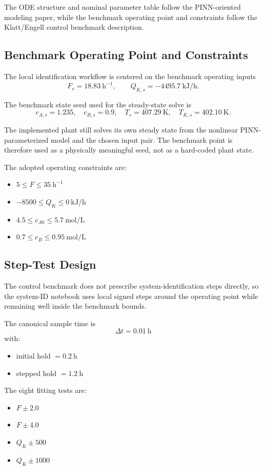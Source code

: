 The ODE structure and nominal parameter table follow the PINN-oriented modeling paper, while the benchmark operating point and constraints follow the Klatt/Engell control benchmark description.

\subsection{Benchmark Operating Point and Constraints}

The local identification workflow is centered on the benchmark operating inputs
\[
F_s = 18.83\ \mathrm{h}^{-1}, \qquad
Q_{K,s} = -4495.7\ \mathrm{kJ/h}.
\]

The benchmark state seed used for the steady-state solve is
\[
c_{A,s} = 1.235,\quad
c_{B,s} = 0.9,\quad
T_s = 407.29\ \mathrm{K},\quad
T_{K,s} = 402.10\ \mathrm{K}.
\]

The implemented plant still solves its own steady state from the nonlinear PINN-parameterized model and the chosen input pair. The benchmark point is therefore used as a physically meaningful seed, not as a hard-coded plant state.

The adopted operating constraints are:
\begin{itemize}
    \item \(5 \leq F \leq 35\ \mathrm{h}^{-1}\)
    \item \(-8500 \leq Q_K \leq 0\ \mathrm{kJ/h}\)
    \item \(4.5 \leq c_{A0} \leq 5.7\ \mathrm{mol/L}\)
    \item \(0.7 \leq c_B \leq 0.95\ \mathrm{mol/L}\)
\end{itemize}

\subsection{Step-Test Design}

The control benchmark does not prescribe system-identification steps directly, so the system-ID notebook uses local signed steps around the operating point while remaining well inside the benchmark bounds.

The canonical sample time is
\[
\Delta t = 0.01\ \mathrm{h}
\]
with:
\begin{itemize}
    \item initial hold \(= 0.2\ \mathrm{h}\)
    \item stepped hold \(= 1.2\ \mathrm{h}\)
\end{itemize}

The eight fitting tests are:
\begin{itemize}
    \item \(F \pm 2.0\)
    \item \(F \pm 4.0\)
    \item \(Q_K \pm 500\)
    \item \(Q_K \pm 1000\)
\end{itemize}

